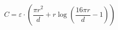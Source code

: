 \documentclass[12pt]{article}
\begin{document}
\begin{displaymath}
C=\varepsilon \cdot (\frac {\pi r^{2}}{d}+r \log (\frac{16\pi r}{d}-1))
\end{displaymath}
\end{document}
